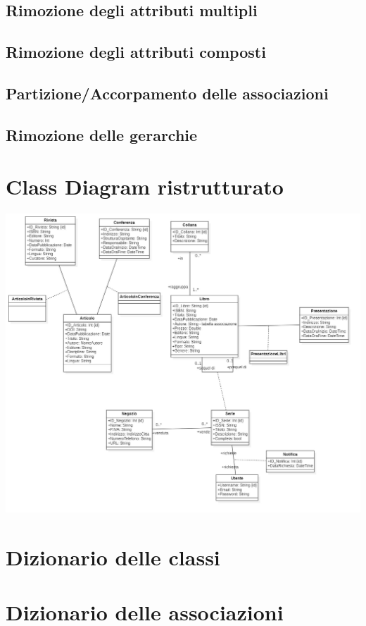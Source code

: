         \subsection{Rimozione degli attributi multipli}
            
        \subsection{Rimozione degli attributi composti}
            
        \subsection{Partizione/Accorpamento delle associazioni}
            
        \subsection{Rimozione delle gerarchie}
    
    \section{Class Diagram ristrutturato}
    \includegraphics[scale=0.25]{Immagini/UMLRisv1.png}
        
    \section{Dizionario delle classi}
        
    \section{Dizionario delle associazioni}